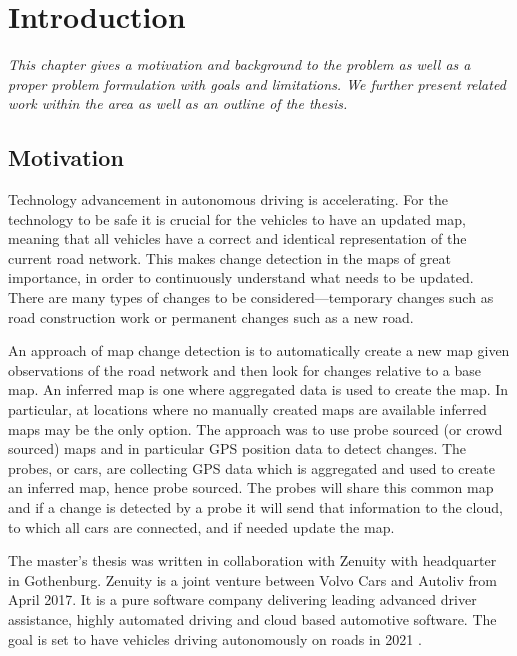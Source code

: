 \chapter{Introduction}
\label{chp:intro}

\textit{This chapter gives a motivation and background to the problem as well as a proper problem formulation with goals and limitations. We further present related work within the area as well as an outline of the thesis.}

\section{Motivation}

Technology advancement in autonomous driving is accelerating. For the technology to be safe it is crucial for the vehicles to have an updated map, meaning that all vehicles have a correct and identical representation of the current road network. This makes change detection in the maps of great importance, in order to continuously understand what needs to be updated. There are many types of changes to be considered---temporary changes such as road construction work or permanent changes such as a new road. 

An approach of map change detection is to automatically create a new map given observations of the road network and then look for changes relative to a base map. An inferred map is one where aggregated data is used to create the map. In particular, at locations where no manually created maps are available inferred maps may be the only option. The approach was to use probe sourced (or crowd sourced) maps and in particular \ac{GPS} position data to detect changes. The probes, or cars, are collecting \ac{GPS} data which is aggregated and used to create an inferred map, hence probe sourced. The probes will share this common map and if a change is detected by a probe it will send that information to the cloud, to which all cars are connected, and if needed update the map.

The master's thesis was written in collaboration with Zenuity with headquarter in Gothenburg. Zenuity is a joint venture between Volvo Cars and Autoliv from April 2017. It is a pure software company delivering leading advanced driver assistance, highly automated driving and cloud based automotive software. The goal is set to have vehicles driving autonomously on roads in 2021 \citep{zenuity}.

